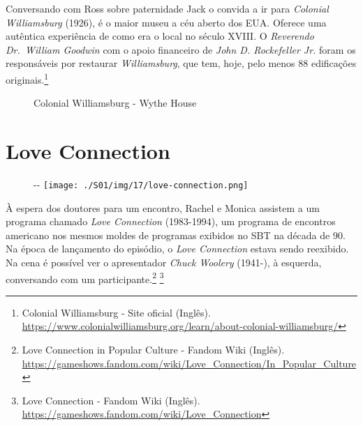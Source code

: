Conversando com Ross sobre paternidade Jack o convida a ir para
\emph{Colonial Williamsburg} (1926), é o maior museu a céu aberto dos
EUA. Oferece uma autêntica experiência de como era o local no século
XVIII. O \emph{Reverendo Dr.~William Goodwin} com o apoio financeiro de
\emph{John D. Rockefeller Jr.} foram os responsáveis por restaurar
\emph{Williamsburg}, que tem, hoje, pelo menos 88 edificações
originais.\footnote{\sloppy Colonial Williamsburg - Site oficial (Inglês). \url{https://www.colonialwilliamsburg.org/learn/about-colonial-williamsburg/}}

\begin{figure}
  \centering
    \caption{Colonial Williamsburg - Wythe House\label{fig:colonial-williamsburg-wythe-house}}
\end{figure}

\hypertarget{love-connection}{%
\section{Love Connection}\label{love-connection}}

\begin{figure}[!ht]
  \begin{adjustwidth}{-\oddsidemargin-1in}{-\rightmargin}
    \centering
    \texttt{[image: ./S01/img/17/love-connection.png]}
  \end{adjustwidth}
\end{figure}

À espera dos doutores para um encontro, Rachel e Monica assistem a um
programa chamado \emph{Love Connection} (1983-1994), um programa de
encontros americano nos mesmos moldes de programas exibidos no SBT na
década de 90. Na época de lançamento do episódio, o \emph{Love
Connection} estava sendo reexibido. Na cena é possível ver o
apresentador \emph{Chuck Woolery} (1941-), à esquerda, conversando com
um participante.\footnote{\sloppy Love Connection in Popular Culture - Fandom Wiki (Inglês). \url{https://gameshows.fandom.com/wiki/Love_Connection/In_Popular_Culture}}
\footnote{\sloppy Love Connection - Fandom Wiki (Inglês). \url{https://gameshows.fandom.com/wiki/Love_Connection}}

